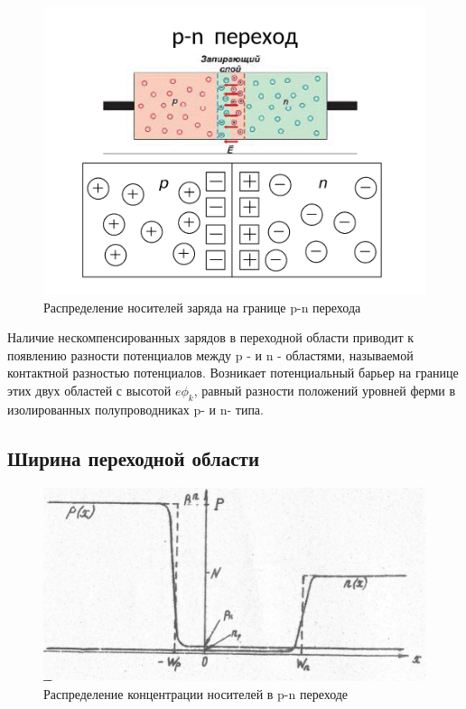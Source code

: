 \documentclass[a4paper]{article}
\begin{document}
\begin{figure}[h!]
    \centering
    \includegraphics[scale=0.35]{image462.jpg}
    \caption{Распределение носителей заряда на границе p-n перехода}
    \label{fig:p-n}
\end{figure}

Наличие нескомпенсированных зарядов в переходной области приводит к появлению разности потенциалов между p - и  n - областями, называемой контактной разностью потенциалов. Возникает потенциальный барьер на границе этих двух областей с высотой $e\phi_{k}$, равный разности положений уровней ферми в изолированных полупроводниках p- и n- типа.
\subsection{Ширина переходной области}

    \begin{figure}[h!]
    \centering
    \includegraphics[scale=1]{im3.png}
    \caption{Распределение концентрации носителей в p-n переходе}
    \label{fig:concentrations}
\end{figure}
\end{document}
